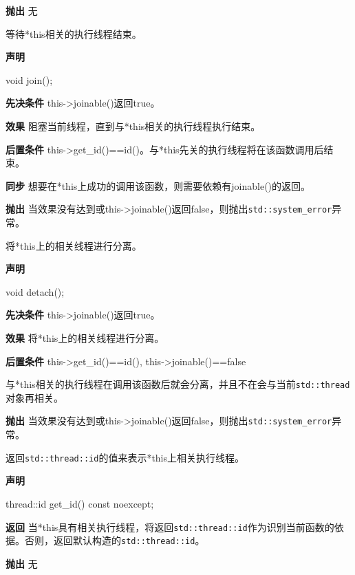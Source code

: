 \textbf{抛出}
无


等待*this相关的执行线程结束。

\textbf{声明}

\begin{cpp}
void join();
\end{cpp}

\textbf{先决条件}
this->joinable()返回true。

\textbf{效果}
阻塞当前线程，直到与*this相关的执行线程执行结束。

\textbf{后置条件}
this->get\_id()==id()。与*this先关的执行线程将在该函数调用后结束。

\textbf{同步}
想要在*this上成功的调用该函数，则需要依赖有joinable()的返回。

\textbf{抛出}
当效果没有达到或this->joinable()返回false，则抛出\texttt{std::system\_error}异常。


将*this上的相关线程进行分离。

\textbf{声明}

\begin{cpp}
void detach();
\end{cpp}

\textbf{先决条件}
this->joinable()返回true。

\textbf{效果}
将*this上的相关线程进行分离。

\textbf{后置条件}
this->get\_id()==id(), this->joinable()==false

与*this相关的执行线程在调用该函数后就会分离，并且不在会与当前\texttt{std::thread}对象再相关。

\textbf{抛出}
当效果没有达到或this->joinable()返回false，则抛出\texttt{std::system\_error}异常。


返回\texttt{std::thread::id}的值来表示*this上相关执行线程。

\textbf{声明}

\begin{cpp}
thread::id get_id() const noexcept;
\end{cpp}

\textbf{返回}
当*this具有相关执行线程，将返回\texttt{std::thread::id}作为识别当前函数的依据。否则，返回默认构造的\texttt{std::thread::id}。

\textbf{抛出}
无


